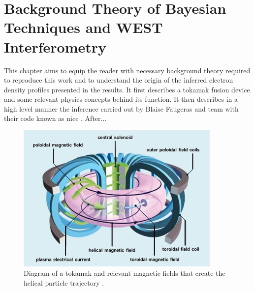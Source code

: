 \chapter{Background Theory of Bayesian Techniques and WEST Interferometry}

This chapter aims to equip the reader with necessary background theory required to reproduce this work and to understand the origin of the inferred electron density profiles presented in the results. It first describes a tokamak fusion device and some relevant physics concepts behind its function. It then describes in a high level manner the inference carried out by Blaise Faugeras and team with their code known as \gls{nice} \cite{nice}. After...

\begin{figure}
  \centering
  \includegraphics[width=10cm]{images/tokamak.jpg}
  \caption{Diagram of a tokamak and relevant magnetic fields that create the helical particle trajectory \cite{tokamakSchema}.}
  \label{fig:tokamakSchema}
\end{figure}

